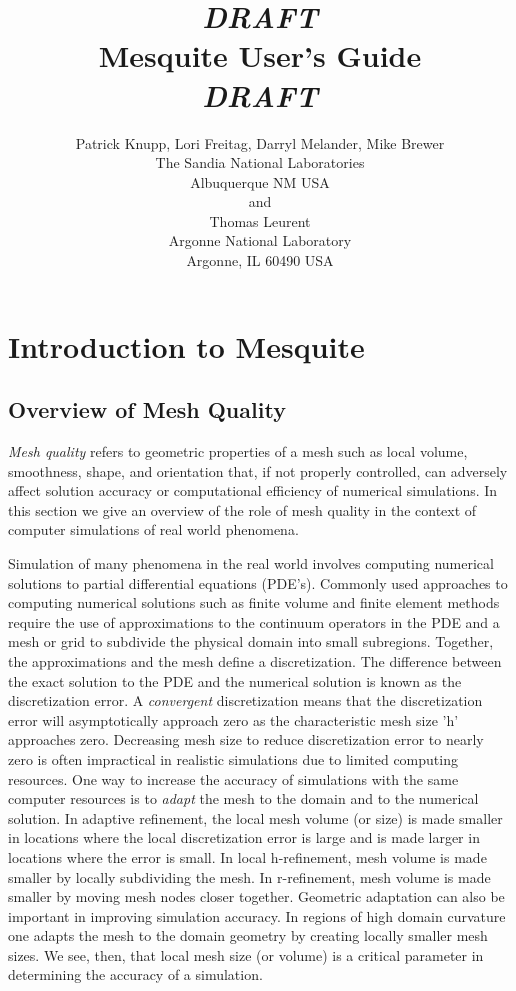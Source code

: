 \documentclass[letter]{report}
\title{ {\LARGE\bf \emph{DRAFT} \\
        Mesquite User's Guide\\
                 \emph{DRAFT} }}
\author{Patrick Knupp, Lori Freitag, Darryl Melander, Mike Brewer \\
The Sandia National Laboratories \\
Albuquerque NM USA \\
and \\
Thomas Leurent \\
Argonne National Laboratory \\
Argonne, IL 60490 USA}
\date{}
\begin{document}
\maketitle

\tableofcontents

\listoffigures

\listoftables

\chapter{Introduction to Mesquite} 

\section{Overview of Mesh Quality}

\hskip 0.25in {\it Mesh quality} refers to geometric properties of a mesh such as 
local volume, smoothness, shape, and orientation that, if not properly 
controlled, 
can adversely affect solution accuracy or computational efficiency of numerical simulations. In this section we give an overview of the role of mesh quality 
in the context of computer simulations of real world phenomena. \newline

Simulation of many phenomena in the real world involves computing numerical 
solutions to partial differential equations (PDE's). Commonly used approaches 
to computing  numerical solutions such as finite volume and finite 
element methods require the use of approximations to the continuum operators 
in the PDE and a mesh or grid to subdivide the physical domain into small 
subregions. Together, the approximations and the mesh define a discretization. 
The difference between the exact solution to the PDE and the numerical solution is known as the discretization error. A {\it convergent} 
discretization means that the discretization error will asymptotically 
approach zero as the characteristic mesh size 'h' 
approaches zero. Decreasing mesh size to reduce discretization error to 
nearly zero is often impractical in realistic simulations due to limited 
computing resources. One way to increase the accuracy of simulations with the 
same computer resources is to {\it adapt} the mesh to the domain and to the 
numerical solution. In adaptive refinement, the local mesh volume (or size) 
is made smaller in locations where the local discretization error is large and 
is made larger in locations where the error is small. In local h-refinement, 
mesh volume is made smaller by locally subdividing the mesh. In 
r-refinement, mesh volume is made smaller by moving mesh nodes closer together.
Geometric adaptation can also be important in improving simulation accuracy. In regions of high domain curvature one adapts the mesh to the domain geometry by creating locally smaller mesh sizes. We see, then, that local mesh size (or volume) is a critical parameter in determining the accuracy of a simulation. \newline
\end{document}

